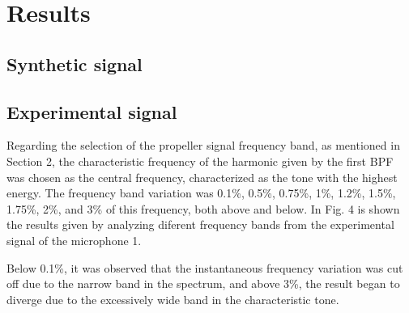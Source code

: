 \documentclass[10pt,fleqn,a4paper,twoside]{article}
\begin{document}
\section{Results}
\subsection{Synthetic signal}
\subsection{Experimental signal}
Regarding the selection of the propeller signal frequency band, as mentioned in Section 2, the characteristic frequency of the harmonic given by the first BPF was chosen as the central frequency, characterized as the tone with the highest energy. The frequency band variation was 0.1\%, 0.5\%, 0.75\%, 1\%, 1.2\%, 1.5\%, 1.75\%, 2\%, and 3\% of this frequency, both above and below. In Fig. 4 is shown the results given by analyzing diferent frequency bands from the experimental signal of the microphone 1.

Below 0.1\%, it was observed that the instantaneous frequency variation was cut off due to the narrow band in the spectrum, and above 3\%, the result began to diverge due to the excessively wide band in the characteristic tone. 
\end{document}
